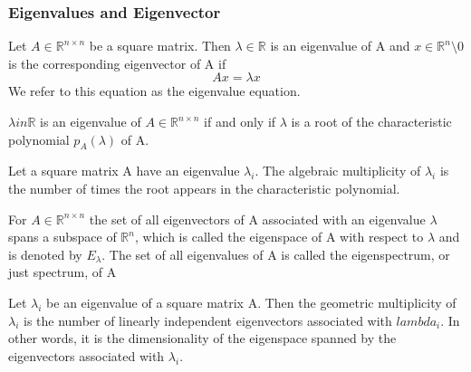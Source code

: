 \subsubsection{Eigenvalues and Eigenvector}
\begin{definition}
    Let $ A \in \mathbb{R}^{n\times n}$ be a square matrix. Then $\lambda \in \mathbb{R}$ is an eigenvalue of A and $x\in \mathbb{R}^n\setminus{0}$ is the corresponding eigenvector of A if
    \[ 
        Ax = \lambda x 
    \]
    We refer to this equation as the eigenvalue equation.
\end{definition}
\begin{theorem}
    $\lambda in \mathbb{R}$ is an eigenvalue of $A \in \mathbb{R}^{n\times n}$ if and only if $\lambda$ is a root of the characteristic polynomial $p_A(\lambda)$ of A.
\end{theorem}
\begin{definition}
    Let a square matrix A have an eigenvalue $\lambda_i$. The algebraic multiplicity of $\lambda_i$ is the number of times the root appears in the characteristic polynomial. 
\end{definition}
\begin{definition}
    For $A \in \mathbb{R}^{n \times n}$ the set of all eigenvectors of A associated with an eigenvalue $\lambda$ spans a subspace of $\mathbb{R}^n$, which is called the eigenspace of A with respect to $\lambda$ and is denoted by $E_\lambda$. The set of all eigenvalues of A is called the eigenspectrum, or just spectrum, of A
\end{definition}
\begin{definition}
    Let $\lambda_i$ be an eigenvalue of a square matrix A. Then the geometric multiplicity of $\lambda_i$ is the number of linearly independent eigenvectors associated with $lambda_i$. In other words, it is the dimensionality of the eigenspace spanned by the eigenvectors associated with $\lambda_i$. 
\end{definition}